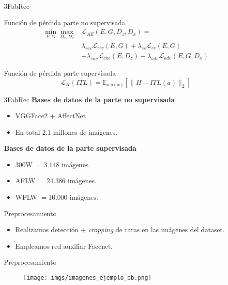 \documentclass[aspectratio=43]{beamer}
\begin{document}
\begin{frame}{3FabRec}
  \begin{block}{Función de pérdida parte no supervisada}
    \begin{align*}
      \min_{E,G} \max_{D_z,D_x} & \mathcal{L}_{AE}(E,G,D_z,D_x) = \\
      & \lambda_{rec} \mathcal{L}_{rec}(E,G) + \lambda_{cs}\mathcal{L}_{cs}(E,G) \\
      & + \lambda_{enc}\mathcal{L}_{enc}(E,D_z)+ \lambda_{adv} \mathcal{L}_{adv}(E,G,D_x)
    \end{align*}
  \end{block}
  \begin{block}{Función de pérdida parte supervisada}
    \begin{equation*}
      \mathcal{L}_H(ITL) = \mathbb{E}_{x ~ p(x)} \left[ \| H-ITL(a)\|_2 \right]
    \end{equation*}
  \end{block}
\end{frame}

\begin{frame}{3FabRec}
  \textcolor{tudCyan}{\textbf{Bases de datos de la parte no supervisada}}
  \begin{itemize}
    \item VGGFace2 + AffectNet
    \item En total $2.1$ millones de imágenes.
  \end{itemize}
  \textcolor{tudCyan}{\textbf{Bases de datos de la parte supervisada}}
  \begin{itemize}
    \item 300W $= 3.148$ imágenes.
    \item AFLW $= 24.386$ imágenes.
    \item WFLW $= 10.000$ imágenes.
  \end{itemize}
\end{frame}

\begin{frame}{Preprocesamiento}
  \begin{itemize}
    \item Realizamos detección + \textit{cropping} de caras en las imágenes del dataset.
    \item Empleamos red auxiliar \textcolor{tudCyan}{Facenet}.
  \end{itemize}
\end{frame}

\begin{frame}{Preprocesamiento}
  \begin{figure}
    \centering
    \texttt{[image: imgs/imagenes\_ejemplo\_bb.png]}
  \end{figure}
\end{frame}
\end{document}

